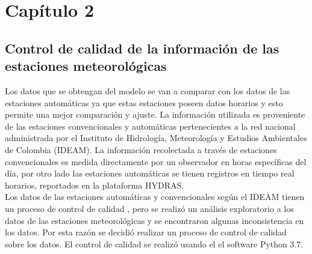 \chapter{Capítulo 2}

\section{Control de calidad de la información de las estaciones meteorológicas}

Los datos que se obtengan del modelo se van a comparar con los datos de las estaciones automáticas ya que estas estaciones poseen datos horarios y esto permite una mejor comparación y ajuste. La información utilizada es proveniente de las estaciones convencionales y automáticas pertenecientes a la red nacional administrada por el Instituto de Hidrología, Meteorología y Estudios Ambientales de Colombia (IDEAM). La información recolectada a través de estaciones convencionales es medida directamente por un observador en horas específicas del día, por otro lado las estaciones automáticas se tienen registros en tiempo real horarios, reportados en la plataforma HYDRAS.\\


Los datos de las estaciones automáticas y convencionales según el IDEAM tienen un proceso de control de calidad \citep{Torres2005}, pero se realizó un análisis exploratorio a los datos de las estaciones meteorológicas y se encontraron algunas inconsistencia en los datos. Por esta razón se decidió realizar un proceso de control de calidad sobre los datos. El control de calidad se realizó usando el el software Python 3.7.\\

